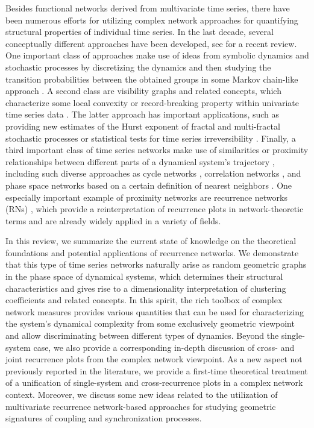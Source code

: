 Besides functional networks derived from multivariate time series, there have been numerous efforts for utilizing complex network approaches for quantifying structural properties of individual time series. In the last decade, several conceptually different approaches have been developed, see \cite{Donner2011IJBC} for a recent review. One important class of approaches make use of ideas from symbolic dynamics and stochastic processes by discretizing the dynamics and then studying the transition probabilities between the obtained groups in some Markov chain-like approach \cite{Nicolis2005}. A second class are visibility graphs and related concepts, which characterize some local convexity or record-breaking property within univariate time series data \cite{Donner2012AG,Lacasa2008,Luque2009}. The latter approach has important applications, such as providing new estimates of the Hurst exponent of fractal and multi-fractal stochastic processes \cite{Lacasa2009,Ni2009} or statistical tests for time series irreversibility \cite{Donges2013EPL,Lacasa2012}. Finally, a third important class of time series networks make use of similarities or proximity relationships between different parts of a dynamical system's trajectory \cite{Donner2011IJBC}, including such diverse approaches as cycle networks \cite{Zhang2006}, correlation networks \cite{Yang2008}, and phase space networks based on a certain definition of nearest neighbors \cite{Xu2008}. One especially important example of proximity networks are recurrence networks (RNs) \cite{Donner2010PRE,Donner2010NJP,Marwan2009}, which provide a reinterpretation of recurrence plots in network-theoretic terms and are already widely applied in a variety of fields.

In this review, we summarize the current state of knowledge on the theoretical foundations and potential applications of recurrence networks. We demonstrate that this type of time series networks naturally arise as random geometric graphs in the phase space of dynamical systems, which determines their structural characteristics and gives rise to a dimensionality interpretation of clustering coefficients and related concepts. In this spirit, the rich toolbox of complex network measures \cite{Boccaletti2006,Costa2007,Newman2003} provides various quantities that can be used for characterizing the system's dynamical complexity from some exclusively geometric viewpoint and allow discriminating between different types of dynamics. Beyond the single-system case, we also provide a corresponding in-depth discussion of cross- and joint recurrence plots from the complex network viewpoint. As a new aspect not previously reported in the literature, we provide a first-time theoretical treatment of a unification of single-system and cross-recurrence plots in a complex network context. Moreover, we discuss some new ideas related to the utilization of multivariate recurrence network-based approaches for studying geometric signatures of coupling and synchronization processes.




